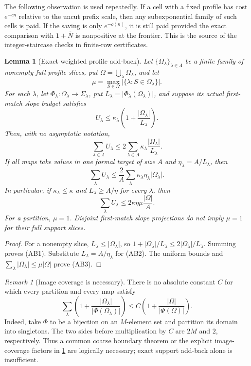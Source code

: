 \documentclass[12pt,a4paper]{amsart}
\numberwithin{equation}{section}
\newtheorem{lemma}[lemma]{Lemma}
\theoremstyle{remark}
\newtheorem{remark}[remark]{Remark}
\newcommand{\barN}{\overline N}
\newcommand{\abs}[1]{\lvert #1\rvert}
\begin{document}
The following observation is used repeatedly.  If a cell with a fixed
profile has cost \(e^{-c n}\) relative to the uncut prefix scale, then any
subexponential family of such cells is paid.  If the saving is only
\(e^{-o(n)}\), it is still paid provided the exact comparison with
\(1+\barN\) is nonpositive at the frontier.  This is the source of the
integer-staircase checks in finite-row certificates.

\begin{lemma}[Exact weighted profile add-back]
\label{lem:exact-profile-addback}
Let \(\{\Omega_\lambda\}_{\lambda\in\Lambda}\) be a finite family of
nonempty full profile slices, put
\(\Omega=\bigcup_\lambda\Omega_\lambda\), and let
\[
 \mu=\max_{S\in\Omega}
       \abs{\{\lambda:S\in\Omega_\lambda\}}.
\]
For each \(\lambda\), let
\(\Phi_\lambda:\Omega_\lambda\to\Sigma_\lambda\), put
\(L_\lambda=\abs{\Phi_\lambda(\Omega_\lambda)}\), and suppose its actual
first-match slope budget satisfies
\[
 U_\lambda\le \kappa_\lambda
 \left(1+\frac{\abs{\Omega_\lambda}}{L_\lambda}\right).
\]
Then, with no asymptotic notation,
\[
 \sum_{\lambda\in\Lambda}U_\lambda
 \le 2\sum_{\lambda\in\Lambda}
       \kappa_\lambda\frac{\abs{\Omega_\lambda}}{L_\lambda}.       \tag{AB1}
\]
If all maps take values in one formal target of size \(A\) and
\(\eta_\lambda=A/L_\lambda\), then
\[
 \sum_\lambda U_\lambda
 \le \frac2A\sum_\lambda
       \kappa_\lambda\eta_\lambda\abs{\Omega_\lambda}.           \tag{AB2}
\]
In particular, if \(\kappa_\lambda\le\kappa\) and
\(L_\lambda\ge A/\eta\) for every \(\lambda\), then
\[
 \sum_\lambda U_\lambda\le
 2\kappa\eta\mu\frac{\abs\Omega}{A}.                            \tag{AB3}
\]
For a partition, \(\mu=1\).  Disjoint first-match slope projections do
not imply \(\mu=1\) for their full support slices.
\end{lemma}

\begin{proof}
For a nonempty slice, \(L_\lambda\le\abs{\Omega_\lambda}\), so
\(1+\abs{\Omega_\lambda}/L_\lambda
 \le2\abs{\Omega_\lambda}/L_\lambda\).  Summing proves
\textup{(AB1)}.  Substitute
\(L_\lambda=A/\eta_\lambda\) for \textup{(AB2)}.  The uniform bounds
and \(\sum_\lambda\abs{\Omega_\lambda}\le\mu\abs\Omega\) prove
\textup{(AB3)}.
\end{proof}

\begin{remark}[Image coverage is necessary]
There is no absolute constant \(C\) for which every partition and every
map satisfy
\[
 \sum_\lambda\left(1+
 \frac{\abs{\Omega_\lambda}}{\abs{\Phi(\Omega_\lambda)}}\right)
 \le C\left(1+
 \frac{\abs\Omega}{\abs{\Phi(\Omega)}}\right).
\]
Indeed, take \(\Phi\) to be a bijection on an \(M\)-element set and
partition its domain into singletons.  The two sides before multiplication
by \(C\) are \(2M\) and \(2\), respectively.  Thus a common coarse
boundary theorem or the explicit image-coverage factors in
\cref{lem:exact-profile-addback} are logically necessary; exact support
add-back alone is insufficient.
\end{remark}
\end{document}
